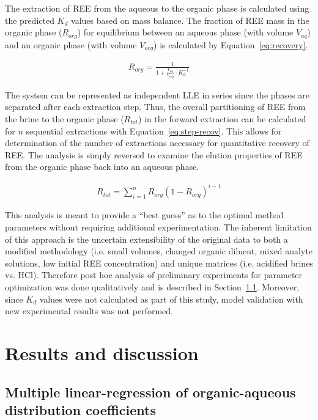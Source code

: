 The extraction of REE from the aqueous to the organic phase is calculated using the predicted $K_d$ values based on mass balance.
The fraction of REE mass in the organic phase ($R_{org}$) for equilibrium between an aqueous phase (with volume $V_{aq}$) and an organic phase (with volume $V_{org}$) is calculated by Equation~\ref{eq:recovery}.

\begin{align}\label{eq:recovery}
R_{org} = \frac{1}{1 + \frac{V_{aq}}{V_{org}} \cdot K_d^{-1}}
\end{align}

The system can be represented as independent LLE in series since the phases are separated after each extraction step.
Thus, the overall partitioning of REE from the brine to the organic phase ($R_{tot}$) in the forward extraction can be calculated for $n$ sequential extractions with Equation~\ref{eq:step-recov}.
This allows for determination of the number of extractions necessary for quantitative recovery of REE.
The analysis is simply reversed to examine the elution properties of REE from the organic phase back into an aqueous phase.

\begin{align}\label{eq:step-recov}
R_{tot} = \sum_{i=1}^n R_{org}\left( 1 - R_{org} \right)^{i-1}
\end{align}

This analysis is meant to provide a ``best guess'' as to the optimal method parameters without requiring additional experimentation.
The inherent limitation of this approach is the uncertain extensibility of the original data to both a modified methodology (i.e. small volumes, changed organic diluent, mixed analyte solutions, low initial REE concentration) and unique matrices (i.e. acidified brines vs. HCl).
Therefore post hoc analysis of preliminary experiments for parameter optimization was done qualitatively and is described in Section~\ref{sec:param-adjust}. Moreover, since $K_d$ values were not calculated as part of this study, model validation with new experimental results was not performed.

\section{Results and discussion}

\subsection{Multiple linear-regression of organic-aqueous distribution coefficients} \label{sec:param-adjust}

